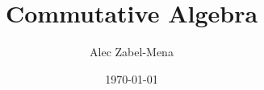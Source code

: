 \documentclass[12pt, twoside]{book}
\title{Commutative Algebra}
\author{Alec Zabel-Mena}
\date{\today}
\begin{document}
\maketitle
\tableofcontents
\newpage



\nocite{*}



\end{document}
